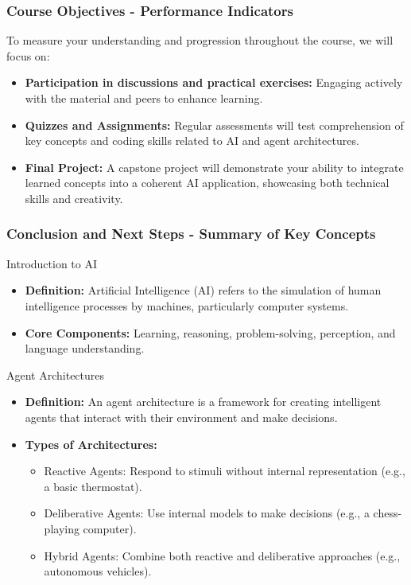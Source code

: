 \documentclass[aspectratio=169]{beamer}
\begin{document}
\begin{frame}
    \frametitle{Course Objectives - Performance Indicators}
    To measure your understanding and progression throughout the course, we will focus on:
    \begin{itemize}
        \item \textbf{Participation in discussions and practical exercises:} Engaging actively with the material and peers to enhance learning.
        \item \textbf{Quizzes and Assignments:} Regular assessments will test comprehension of key concepts and coding skills related to AI and agent architectures.
        \item \textbf{Final Project:} A capstone project will demonstrate your ability to integrate learned concepts into a coherent AI application, showcasing both technical skills and creativity.
    \end{itemize}
\end{frame}

\begin{frame}[fragile]
    \frametitle{Conclusion and Next Steps - Summary of Key Concepts}
    \begin{block}{Introduction to AI}
        \begin{itemize}
            \item \textbf{Definition:} Artificial Intelligence (AI) refers to the simulation of human intelligence processes by machines, particularly computer systems.
            \item \textbf{Core Components:} Learning, reasoning, problem-solving, perception, and language understanding.
        \end{itemize}
    \end{block}
    
    \begin{block}{Agent Architectures}
        \begin{itemize}
            \item \textbf{Definition:} An agent architecture is a framework for creating intelligent agents that interact with their environment and make decisions.
            \item \textbf{Types of Architectures:}
            \begin{itemize}
                \item Reactive Agents: Respond to stimuli without internal representation (e.g., a basic thermostat).
                \item Deliberative Agents: Use internal models to make decisions (e.g., a chess-playing computer).
                \item Hybrid Agents: Combine both reactive and deliberative approaches (e.g., autonomous vehicles).
            \end{itemize}
        \end{itemize}
    \end{block}
\end{frame}
\end{document}
